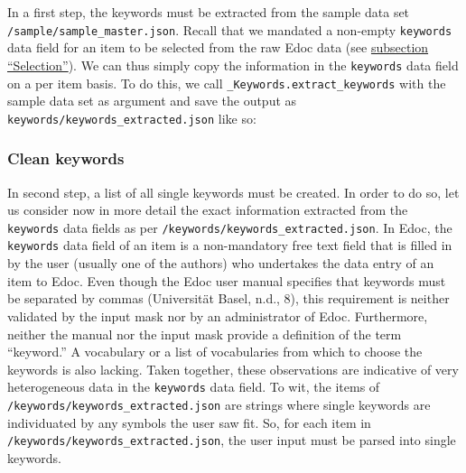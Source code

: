 In a first step, the keywords must be extracted from the sample data set
\texttt{/sample/sample\_master.json}. Recall that we mandated a
non-empty \texttt{keywords} data field for an item to be selected from
the raw Edoc data (see \protect\hyperlink{selection}{subsection
``Selection''}). We can thus simply copy the information in the
\texttt{keywords} data field on a per item basis. To do this, we call
\texttt{\_Keywords.extract\_keywords} with the sample data set as
argument and save the output as
\texttt{keywords/keywords\_extracted.json} like so:

\begin{Shaded}
\begin{Highlighting}[]
\OperatorTok{=}\OperatorTok{+} \NormalTok{)}
\OperatorTok{+} \NormalTok{)}
\end{Highlighting}
\end{Shaded}

\hypertarget{clean-keywords}{%
\subsubsection{Clean keywords}\label{clean-keywords}}

In second step, a list of all single keywords must be created. In order
to do so, let us consider now in more detail the exact information
extracted from the \texttt{keywords} data fields as per
\texttt{/keywords/keywords\_extracted.json}. In Edoc, the
\texttt{keywords} data field of an item is a non-mandatory free text
field that is filled in by the user (usually one of the authors) who
undertakes the data entry of an item to Edoc. Even though the Edoc user
manual specifies that keywords must be separated by commas (Universität
Basel, n.d., 8), this requirement is neither validated by the input mask
nor by an administrator of Edoc. Furthermore, neither the manual nor the
input mask provide a definition of the term ``keyword.'' A vocabulary or
a list of vocabularies from which to choose the keywords is also
lacking. Taken together, these observations are indicative of very
heterogeneous data in the \texttt{keywords} data field. To wit, the
items of \texttt{/keywords/keywords\_extracted.json} are strings where
single keywords are individuated by any symbols the user saw fit. So,
for each item in \texttt{/keywords/keywords\_extracted.json}, the user
input must be parsed into single keywords.

